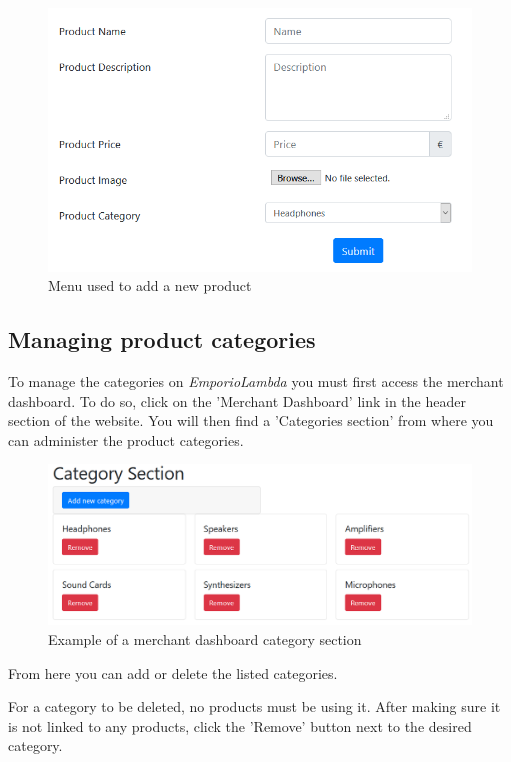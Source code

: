 \begin{figure}[H]
\centering
\includegraphics[scale=0.6]{res/Immagini/AddProduct}
\caption{Menu used to add a new product}
\end{figure}

\subsection{Managing product categories}
To manage the categories on \textit{EmporioLambda} you must first access the merchant dashboard. To do so, click on the 'Merchant Dashboard' link in the header section of the website. You will then find a 'Categories section' from where you can administer the product categories.

\begin{figure}[H]
\centering
\includegraphics[scale=0.6]{res/Immagini/CategorySection}
\caption{Example of a merchant dashboard category section}
\end{figure}

From here you can add or delete the listed categories.

For a category to be deleted, no products must be using it. After making sure it is not linked to any products, click the 'Remove' button next to the desired category.

